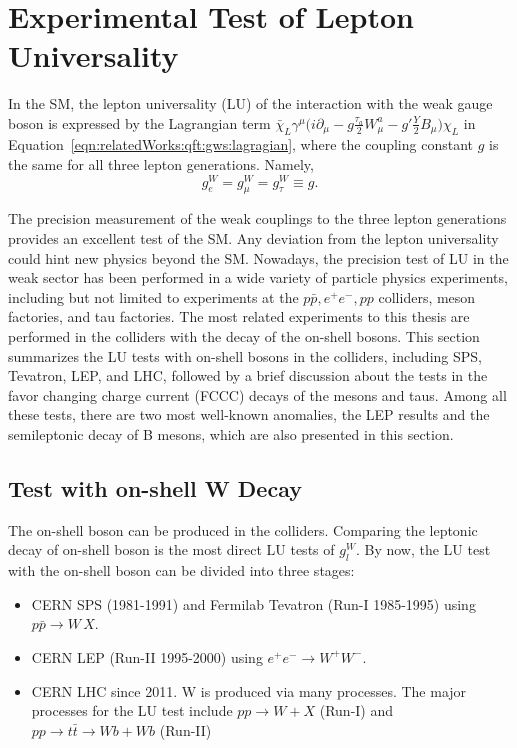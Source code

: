 
\section{Experimental Test of Lepton Universality}
\label{sec:relatedWorks:lu}

In the SM, the lepton universality (LU) of the interaction with the weak gauge boson is expressed by the Lagrangian term $\bar{\chi}_L \gamma^\mu \big( i \partial_\mu -g \frac{\tau_a}{2} W^a_\mu -g'\frac{Y}{2} B_\mu \big) \chi_L $ in Equation~\ref{eqn:relatedWorks:qft:gws:lagragian}, where the coupling constant $g$ is the same for all three lepton generations. Namely,
\begin{equation}
	g_e^W = g_\mu^W = g_\tau^W \equiv g.
\end{equation}

\noindent The precision measurement of the weak couplings to the three lepton generations provides an excellent test of the SM. Any deviation from the lepton universality could hint new physics beyond the SM. Nowadays, the precision test of LU in the weak sector has been performed in a wide variety of particle physics experiments, including but not limited to experiments at the $p\bar{p}, e^+ e^-, pp$ colliders, meson factories, and tau factories. The most related experiments to this thesis are performed in the colliders with the decay of the on-shell \PW bosons. This section summarizes the LU tests with on-shell \PW bosons in the colliders, including SPS, Tevatron, LEP, and LHC, followed by a brief discussion about the tests in the favor changing charge current (FCCC) decays of the mesons and taus. Among all these tests, there are two most well-known anomalies, the LEP results and the semileptonic decay of B mesons, which are also presented in this section. 


\subsection{Test with on-shell W Decay}
\label{sec:relatedWorks:lu:W}


The on-shell \PW boson can be produced in the colliders. Comparing the leptonic decay of on-shell \PW boson is the most direct LU tests of $g^W_l$. By now, the LU test with the on-shell \PW boson can be divided into three stages:

\begin{itemize}
    \item CERN SPS (1981-1991) and Fermilab Tevatron (Run-I 1985-1995) using \mbox{$p \bar{p} \to W \, X$}.
    \item CERN LEP (Run-II 1995-2000) using $e^+e^- \to W^+  W^-$.
    \item CERN LHC since 2011. W is produced via many processes. The major processes for the LU test include $pp \to W +X$ (Run-I) and $pp \to t \bar{t} \to Wb+Wb$ (Run-II)
\end{itemize}

